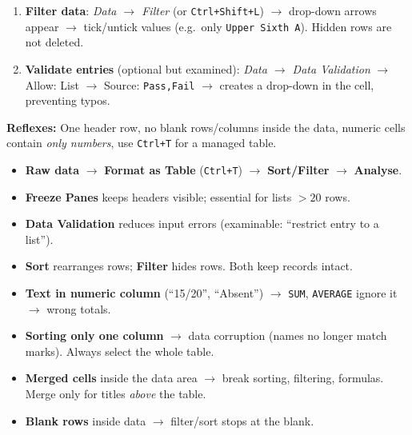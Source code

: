\documentclass[11pt]{article}
\begin{document}
\begin{methode}
\begin{enumerate}
\item \textbf{Filter data}: \emph{Data $\rightarrow$ Filter} (or \texttt{Ctrl+Shift+L}) $\rightarrow$ drop-down arrows appear $\rightarrow$ tick/untick values (e.g.\ only \texttt{Upper Sixth A}). Hidden rows are not deleted.
\item \textbf{Validate entries} (optional but examined): \emph{Data $\rightarrow$ Data Validation} $\rightarrow$ Allow: List $\rightarrow$ Source: \texttt{Pass,Fail} $\rightarrow$ creates a drop-down in the cell, preventing typos.
\end{enumerate}
\textbf{Reflexes:} One header row, no blank rows/columns inside the data, numeric cells contain \emph{only numbers}, use \texttt{Ctrl+T} for a managed table.
\end{methode}

\begin{aretenir}
\begin{itemize}
\item \textbf{Raw data} $\rightarrow$ \textbf{Format as Table} (\texttt{Ctrl+T}) $\rightarrow$ \textbf{Sort/Filter} $\rightarrow$ \textbf{Analyse}.
\item \textbf{Freeze Panes} keeps headers visible; essential for lists $>20$ rows.
\item \textbf{Data Validation} reduces input errors (examinable: ``restrict entry to a list'').
\item \textbf{Sort} rearranges rows; \textbf{Filter} hides rows. Both keep records intact.
\end{itemize}
\end{aretenir}

\begin{attention}
\begin{itemize}
\item \textbf{Text in numeric column} (``15/20'', ``Absent'') $\rightarrow$ \texttt{SUM}, \texttt{AVERAGE} ignore it $\rightarrow$ wrong totals.
\item \textbf{Sorting only one column} $\rightarrow$ data corruption (names no longer match marks). Always select the whole table.
\item \textbf{Merged cells} inside the data area $\rightarrow$ break sorting, filtering, formulas. Merge only for titles \emph{above} the table.
\item \textbf{Blank rows} inside data $\rightarrow$ filter/sort stops at the blank.
\end{itemize}
\end{attention}
\end{document}

